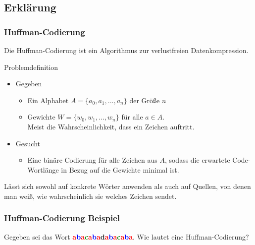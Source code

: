\subsection{Erklärung}
\begin{frame}
	\frametitle{Huffman-Codierung}
	Die Huffman-Codierung ist ein Algorithmus zur verlustfreien Datenkompression.
	\begin{block}{Problemdefinition}
	\begin{itemize}
		\item Gegeben
		\begin{itemize}
			\item Ein Alphabet $A = \{a_0, a_1, ..., a_n\}$ der Größe $n$
			\item Gewichte $W = \{w_0, w_1, ..., w_n\}$ für alle $a \in A$. \\
			Meist die Wahrscheinlichkeit, dass ein Zeichen auftritt.
		\end{itemize}
		\item Gesucht
		\begin{itemize}
			\item Eine binäre Codierung für alle Zeichen aus $A$, sodass die erwartete Code-Wortlänge in Bezug auf die Gewichte minimal ist.
		\end{itemize}		
	\end{itemize}
	\end{block}
	 {
	Lässt sich sowohl auf konkrete Wörter anwenden als auch auf Quellen, von denen man weiß, wie wahrscheinlich sie welches Zeichen sendet.
	}
\end{frame}
\begin{frame}
	\frametitle{Huffman-Codierung Beispiel}
	Gegeben sei das Wort \textbf{\textcolor{red}{a}\textcolor{blue}{b}\textcolor{red}{a}\textcolor{green}{c}\textcolor{red}{a}\textcolor{blue}{b}\textcolor{red}{a}d\textcolor{red}{a}\textcolor{blue}{b}\textcolor{red}{a}\textcolor{green}{c}\textcolor{red}{a}\textcolor{blue}{b}\textcolor{red}{a}}. Wie lautet eine Huffman-Codierung? \\
	\visible<2>{
		\begin{itemize}
			\item \textcolor{red}{\#a = 8}
			\item \textcolor{blue}{\#b = 4}
			\item \textcolor{green}{\#c = 2}
			\item \textcolor{brown}{\#d = 1}
		\end{itemize}
	}
\end{frame}
